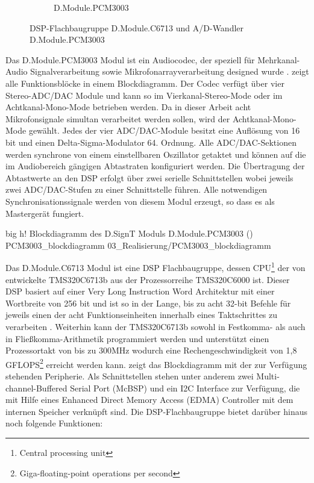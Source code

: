 \begin{figure}
\begin{subfigure}[b]{0.48\textwidth}
                \caption{D.Module.PCM3003}
                \label{fig:D.Module.PCM3003}
        \end{subfigure}
        \caption{DSP-Flachbaugruppe D.Module.C6713 und A/D-Wandler D.Module.PCM3003}
        \label{fig:DSP_PCM3003}
\end{figure}


Das D.Module.PCM3003 Modul ist ein Audiocodec, der speziell für Mehrkanal-Audio Signalverarbeitung sowie Mikrofonarrayverarbeitung designed wurde \cite[S. 1]{Manual_PCM3003}.  zeigt alle Funktionsblöcke in einem Blockdiagramm. Der Codec verfügt über vier Stereo-ADC/DAC Module und kann so im Vierkanal-Stereo-Mode oder im Achtkanal-Mono-Mode betrieben werden. Da in dieser Arbeit acht Mikrofonsignale simultan verarbeitet werden sollen, wird der Achtkanal-Mono-Mode gewählt. Jedes der vier ADC/DAC-Module besitzt eine Auflösung von 16 bit und einen Delta-Sigma-Modulator 64. Ordnung. Alle ADC/DAC-Sektionen werden synchrone von einem einstellbaren Oszillator getaktet und können auf die im Audiobereich gängigen Abtastraten konfiguriert werden. Die Übertragung der Abtastwerte an den DSP erfolgt über zwei serielle Schnittstellen wobei jeweils zwei ADC/DAC-Stufen zu einer Schnittstelle führen. Alle notwendigen Synchronisationssignale werden von diesem Modul erzeugt, so dass es als Mastergerät fungiert.


         {big}                                                       %
         {h!}                                                  %
         {Blockdiagramm des D.SignT Moduls D.Module.PCM3003 (\vgl \cite[S. 1]{Manual_PCM3003})}    %
         {PCM3003_blockdiagramm}                                               %
         {03_Realisierung/PCM3003_blockdiagramm} 



Das D.Module.C6713 Modul ist eine DSP Flachbaugruppe, dessen CPU\footnote{Central processing unit} der von \ti entwickelte TMS320C6713b aus der Prozessorreihe TMS320C6000 ist. Dieser DSP basiert 
auf einer Very Long Instruction Word Architektur mit einer Wortbreite von 256 bit und ist so in der Lange, bis zu acht 32-bit Befehle für jeweils einen der acht Funktionseinheiten innerhalb eines Taktschrittes zu verarbeiten \cite[S. 14]{Manual_dsp_datasheet}. Weiterhin kann der TMS320C6713b sowohl in Festkomma- als auch in Fließkomma-Arithmetik programmiert werden und unterstützt einen Prozessortakt von bis zu 300MHz wodurch eine Rechengeschwindigkeit von 1,8 GFLOPS\footnote{Giga-floating-point operations per second} erreicht werden kann.  zeigt das Blockdiagramm mit der zur Verfügung stehenden Peripherie. Als Schnittstellen stehen unter anderem zwei Multi-channel-Buffered Serial Port (McBSP) und ein I2C Interface zur Verfügung, die mit Hilfe eines Enhanced Direct Memory Access (EDMA) Controller mit dem internen Speicher verknüpft sind. Die DSP-Flachbaugruppe bietet darüber hinaus noch folgende Funktionen:

